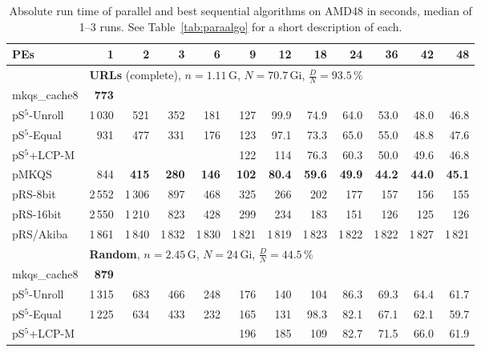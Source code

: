 \documentclass[a4paper]{myjournal}
\begin{document}
\begin{table}\centering\small
\caption{Absolute run time of parallel and best sequential algorithms on AMD48 in seconds, median of 1--3 runs. See Table~\ref{tab:paraalgo} for a short description of each.}\label{tab:absrun-AMD48}
\def\tabcolsep{2.8pt}
\begin{tabular}{l|*{11}{r}|@{}}
PEs & 1   & 2 & 3 & 6 & 9 & 12 & 18 & 24 & 36 & 42 & 48 \\ \hline
& \multicolumn{11}{l|}{\textbf{URLs} (complete), $n = 1.11\,\text{G}$, $N = 70.7\,\text{Gi}$, $\frac{D}{N} = 93.5\,\%$} \\ \cline{2-12}
mkqs\_cache8 & \bf 773 &  &  &  &  &  &  &  &  &  &  \\
pS$^5$-Unroll & 1\,030 &     521 &     352 &     181 &     127 &     99.9 &     74.9 &     64.0 &     53.0 &     48.0 &     46.8 \\
 pS$^5$-Equal &    931 &     477 &     331 &     176 &     123 &     97.1 &     73.3 &     65.0 &     55.0 &     48.8 &     47.6 \\
 pS$^5$+LCP-M &        &         &         &         &     122 &      114 &     76.3 &     60.3 &     50.0 &     49.6 &     46.8 \\
        pMKQS &    844 & \bf 415 & \bf 280 & \bf 146 & \bf 102 & \bf 80.4 & \bf 59.6 & \bf 49.9 & \bf 44.2 & \bf 44.0 & \bf 45.1 \\
     pRS-8bit & 2\,552 &  1\,306 &     897 &     468 &     325 &      266 &      202 &      177 &      157 &      156 &      155 \\
    pRS-16bit & 2\,550 &  1\,210 &     823 &     428 &     299 &      234 &      183 &      151 &      126 &      125 &      126 \\
    pRS/Akiba & 1\,861 &  1\,840 &  1\,832 &  1\,830 &  1\,821 &   1\,819 &   1\,823 &   1\,822 &   1\,822 &   1\,827 &   1\,821 \\ \hline
& \multicolumn{11}{l|}{\textbf{Random}, $n = 2.45\,\text{G}$, $N = 24\,\text{Gi}$, $\frac{D}{N} = 44.5\,\%$} \\ \cline{2-12}
mkqs\_cache8 & \bf 879 &  &  &  &  &  &  &  &  &  &  \\
pS$^5$-Unroll & 1\,315 &     683 &     466 &     248 &     176 &      140 &      104 &     86.3 &     69.3 &     64.4 &     61.7 \\
 pS$^5$-Equal & 1\,225 &     634 &     433 &     232 &     165 &      131 &     98.3 &     82.1 &     67.1 &     62.1 &     59.7 \\
 pS$^5$+LCP-M &        &         &         &         &     196 &      185 &      109 &     82.7 &     71.5 &     66.0 &     61.9 \\

\end{tabular}
\end{table}
\end{document}
